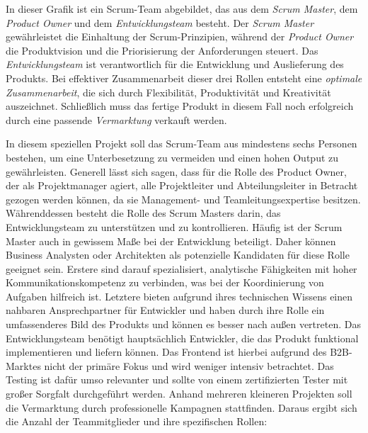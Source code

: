 In dieser Grafik ist ein Scrum-Team abgebildet, das aus dem \textit{Scrum Master}, dem \textit{Product Owner} und dem \textit{Entwicklungsteam} besteht. Der \textit{Scrum Master} gewährleistet die Einhaltung der Scrum-Prinzipien, während der \textit{Product Owner} die Produktvision und die Priorisierung der Anforderungen steuert. Das \textit{Entwicklungsteam} ist verantwortlich für die Entwicklung und Auslieferung des Produkts. Bei effektiver Zusammenarbeit dieser drei Rollen entsteht eine \textit{optimale Zusammenarbeit}, die sich durch Flexibilität, Produktivität und Kreativität auszeichnet. Schließlich muss das fertige Produkt in diesem Fall noch erfolgreich durch eine passende \textit{Vermarktung} verkauft werden.

In diesem speziellen Projekt soll das Scrum-Team aus mindestens sechs Personen bestehen, um eine Unterbesetzung zu vermeiden und einen hohen Output zu gewährleisten. Generell lässt sich sagen, dass für die Rolle des Product Owner, der als Projektmanager agiert, alle Projektleiter und Abteilungsleiter in Betracht gezogen werden können, da sie Management- und Teamleitungsexpertise besitzen. Währenddessen besteht die Rolle des Scrum Masters darin, das Entwicklungsteam zu unterstützen und zu kontrollieren. Häufig ist der Scrum Master auch in gewissem Maße bei der Entwicklung beteiligt. Daher können Business Analysten oder Architekten als potenzielle Kandidaten für diese Rolle geeignet sein. Erstere sind darauf spezialisiert, analytische Fähigkeiten mit hoher Kommunikationskompetenz zu verbinden, was bei der Koordinierung von Aufgaben hilfreich ist. Letztere bieten aufgrund ihres technischen Wissens einen nahbaren Ansprechpartner für Entwickler und haben durch ihre Rolle ein umfassenderes Bild des Produkts und können es besser nach außen vertreten. Das Entwicklungsteam benötigt hauptsächlich Entwickler, die das Produkt funktional implementieren und liefern können. Das Frontend ist hierbei aufgrund des B2B-Marktes nicht der primäre Fokus und wird weniger intensiv betrachtet. Das Testing ist dafür umso relevanter und sollte von einem zertifizierten Tester mit großer Sorgfalt durchgeführt werden. Anhand mehreren kleineren Projekten soll die Vermarktung durch professionelle Kampagnen stattfinden. Daraus ergibt sich die Anzahl der Teammitglieder und ihre spezifischen Rollen:

